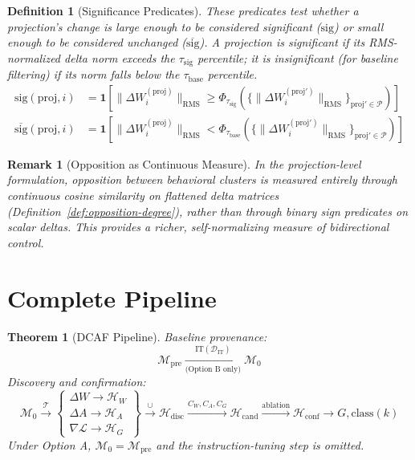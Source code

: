 \documentclass[11pt]{article}
\newtheorem{definition}{Definition}[section]
\newtheorem{theorem}{Theorem}[section]
\newtheorem{remark}{Remark}[section]
\begin{document}
\begin{definition}[Significance Predicates]
\label{def:significance-predicates}
These predicates test whether a projection's change is large enough to be considered significant ($\text{sig}$) or small enough to be considered unchanged ($\overline{\text{sig}}$). A projection is significant if its RMS-normalized delta norm exceeds the $\tau_{\text{sig}}$ percentile; it is insignificant (for baseline filtering) if its norm falls below the $\tau_{\text{base}}$ percentile.
\begin{align}
\text{sig}(\text{proj}, i) &= \mathbf{1}\left[\|\Delta W^{(\text{proj})}_i\|_{\text{RMS}} \geq \Phi_{\tau_{\text{sig}}}(\{\|\Delta W^{(\text{proj}')}_i\|_{\text{RMS}}\}_{\text{proj}' \in \mathcal{P}})\right] \\
\overline{\text{sig}}(\text{proj}, i) &= \mathbf{1}\left[\|\Delta W^{(\text{proj})}_i\|_{\text{RMS}} < \Phi_{\tau_{\text{base}}}(\{\|\Delta W^{(\text{proj}')}_i\|_{\text{RMS}}\}_{\text{proj}' \in \mathcal{P}})\right]
\end{align}
\end{definition}

\begin{remark}[Opposition as Continuous Measure]
\label{rem:opposition-as-continuous-measure}
In the projection-level formulation, opposition between behavioral clusters is measured entirely through continuous cosine similarity on flattened delta matrices (Definition~\ref{def:opposition-degree}), rather than through binary sign predicates on scalar deltas. This provides a richer, self-normalizing measure of bidirectional control.
\end{remark}

\section{Complete Pipeline}
\label{app:pipeline}

\begin{theorem}[DCAF Pipeline]
Baseline provenance:
\begin{equation}
\mathcal{M}_{\text{pre}} \xrightarrow[\text{(Option B only)}]{\text{IT}(\mathcal{D}_{\text{IT}})} \mathcal{M}_0
\end{equation}
Discovery and confirmation:
\begin{equation}
\mathcal{M}_0 \xrightarrow{\mathcal{T}} \begin{Bmatrix} \Delta W \to \mathcal{H}_W \\ \Delta A \to \mathcal{H}_A \\ \nabla \mathcal{L} \to \mathcal{H}_G \end{Bmatrix} \xrightarrow{\cup} \mathcal{H}_{\text{disc}} \xrightarrow{C_W, C_A, C_G} \mathcal{H}_{\text{cand}} \xrightarrow{\text{ablation}} \mathcal{H}_{\text{conf}} \to G, \text{class}(k)
\end{equation}
Under Option A, $\mathcal{M}_0 = \mathcal{M}_{\text{pre}}$ and the instruction-tuning step is omitted.
\end{theorem}
\end{document}
